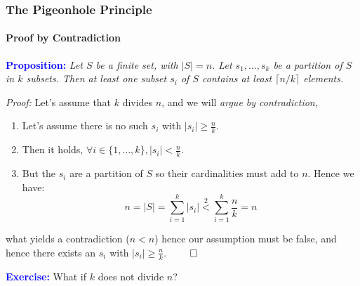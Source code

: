 \documentclass[9pt,    %
    english,            %
    xcolor=table,       %
    envcountsect,        %
    aspectratio=169     %
]{beamer}
\begin{document}
\begin{frame}
    \frametitle{The Pigeonhole Principle}
    \framesubtitle{Proof by Contradiction}

    \textbf{\textcolor{blue}{Proposition:}}
    \textit{
        Let $S$ be a finite set, with $|S| = n$.
        Let $s_1, \dots, s_k$ be a partition of $S$ in $k$ subsets.
        Then at least one subset $s_i$ of $S$ contains at least $\lceil n/k \rceil$ elements.
    }

    \vspace{5pt}

    \emph{Proof:}
    Let's assume that $k$ divides $n$, and we will \emph{argue by contradiction},

    \begin{enumerate}
        \item Let's assume there is no such $s_i$ with $|s_i| \geq \frac{n}{k}$.
        \item Then it holds, $\forall i \in \lbrace 1, \dots, k \rbrace, |s_i| < \frac{n}{k}$.
        \item But the $s_i$ are a partition of $S$ so their cardinalities must add to $n$. Hence we have:
$$
            n = |S| = \sum_{i = 1}^k |s_i| \overset{2}{<} \sum_{i = 1}^k \frac{n}{k} = n
$$
    \end{enumerate}
    what yields a contradiction ($n < n$) hence our assumption must be false, and hence there exists an $s_i$ with $|s_i| \geq \frac{n}{k}$. \hfill $\qed$

    \vspace{10pt}

    \begin{center}
        \textbf{\textcolor{blue}{Exercise:}} What if $k$ does not divide $n$?
    \end{center}
\end{frame}
\end{document}
